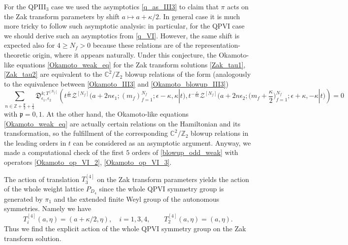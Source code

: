 \documentclass[12pt,a4paper]{article}
\numberwithin{equation}{section}
\begin{document}
For the QPIII$_3$ case we used the asymptotics \eqref{q_as_III3} to claim that $\pi$ acts on the Zak transform parameters by shift $a\mapsto a+\kappa/2$. In general case it is much more tricky to follow such asymptotic analysis: in particular, for the QPVI case we should derive such an asymptotics from \eqref{q_VI}. However, the same shift is expected also for $4\geq N_f>0$ because these relations are of the representation-theoretic origin, where it appears naturally. Under this conjecture, the Okamoto-like equations \eqref{Okamoto_weak_eq} for the Zak transform solutions \eqref{Zak_tau1}, \eqref{Zak_tau2} are equivalent to the $\mathbb{C}^2/\mathbb{Z}_2$ blowup relations of the form (analogously to the equivalence between \eqref{Okamoto_III3} and \eqref{Okamoto_blowup_III3})%
\begin{equation}\label{blowup_odd_weak}
\sum_{n\in\mathbb{Z}+\frac{\mathfrak{p}}2+\frac14}\mathfrak{D}^{k;T^{[N_f]}}_{\epsilon_1,\epsilon_2}\left(t^{\frac{\epsilon}{8\kappa}}\mathcal{Z}^{[N_f]}\big(a{+}2n\epsilon_1;(m_f)_{f=1}^{N_f};\epsilon{-}\kappa,\kappa|t\big),t^{-\frac{\epsilon}{8\kappa}}\mathcal{Z}^{[N_f]}\big(a{+}2n\epsilon_2;\big(m_f{+}\frac{\kappa}2\big)_{f=1}^{N_f};\epsilon{+}\kappa,-\kappa|t\big)\right)=0
\end{equation}
with $\mathfrak{p}=0,1$.
At the other hand, the Okamoto-like equations \eqref{Okamoto_weak_eq} are actually certain relations on the Hamiltonian and its  transformation,
so the fulfillment of the corresponding $\mathbb{C}^2/\mathbb{Z}_2$ blowup relations in the leading orders in $t$ can be considered as an asymptotic argument. Anyway, we made a computational check of the first $5$ orders of \eqref{blowup_odd_weak} with operators \eqref{Okamoto_op_VI_2}, \eqref{Okamoto_op_VI_3}. 

The action of translation $T_3^{[4]}$ on the Zak transform parameters yields the action of the whole weight lattice $P_{D_4}$ since the whole QPVI symmetry group is generated by $\pi_1$ and the extended finite Weyl group of the autonomous symmetries. Namely we have
\begin{equation}
T_i^{[4]}(a,\eta)=(a+\kappa/2,\eta), \quad i=1,3,4, \qquad T_2^{[4]}(a,\eta)=(a,\eta).    
\end{equation}
Thus we find the explicit action of the whole QPVI symmetry group on the Zak transform solution. 
\end{document}
